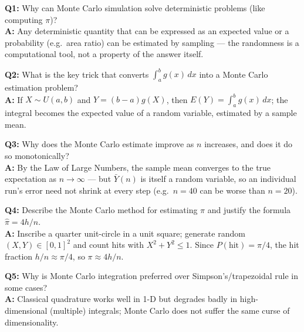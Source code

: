 \begin{qabox}
\textbf{Q1:} Why can Monte Carlo simulation solve deterministic problems (like computing $\pi$)? \\
\textbf{A:} Any deterministic quantity that can be expressed as an expected value or a probability (e.g.\ area ratio) can be estimated by sampling — the randomness is a computational tool, not a property of the answer itself.

\textbf{Q2:} What is the key trick that converts $\int_a^b g(x)\,dx$ into a Monte Carlo estimation problem? \\
\textbf{A:} If $X\sim U(a,b)$ and $Y=(b-a)g(X)$, then $E(Y)=\int_a^b g(x)\,dx$; the integral becomes the expected value of a random variable, estimated by a sample mean.

\textbf{Q3:} Why does the Monte Carlo estimate improve as $n$ increases, and does it do so monotonically? \\
\textbf{A:} By the Law of Large Numbers, the sample mean converges to the true expectation as $n\to\infty$ — but $\bar Y(n)$ is itself a random variable, so an individual run's error need not shrink at every step (e.g.\ $n=40$ can be worse than $n=20$).

\textbf{Q4:} Describe the Monte Carlo method for estimating $\pi$ and justify the formula $\hat\pi=4h/n$. \\
\textbf{A:} Inscribe a quarter unit-circle in a unit square; generate random $(X,Y)\in[0,1]^2$ and count hits with $X^2+Y^2\le1$. Since $P(\text{hit})=\pi/4$, the hit fraction $h/n\approx\pi/4$, so $\pi\approx4h/n$.

\textbf{Q5:} Why is Monte Carlo integration preferred over Simpson's/trapezoidal rule in some cases? \\
\textbf{A:} Classical quadrature works well in 1-D but degrades badly in high-dimensional (multiple) integrals; Monte Carlo does not suffer the same curse of dimensionality.
\end{qabox}
